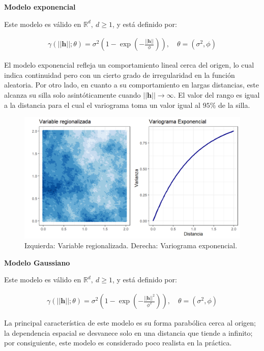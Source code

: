 \documentclass[
]{book}
\begin{document}
\textbf{Modelo exponencial}

Este modelo es válido en \(\mathbb{R}^d,\ d\geq 1\), y está definido por:

\begin{align}
    \gamma(||\textbf{h}||;\theta)=\sigma^2 \left(1-\exp\left(-\frac{||\textbf{h}||}{\phi}\right) \right),\quad \theta=(\sigma^2,\phi)
\end{align}

El modelo exponencial refleja un comportamiento lineal cerca del origen, lo cual indica continuidad pero con un cierto grado de irregularidad en la función aleatoria. Por otro lado, en cuanto a su comportamiento en largas distancias, este alcanza su silla solo asintóticamente cuando \(||\textbf{h}||\to \infty\). El valor del rango es igual a la distancia para el cual el variograma toma un valor igual al \(95\%\) de la silla.

\begin{figure}
\includegraphics[width=17.78in]{figuras/otros/exp_var} \caption{Izquierda: Variable regionalizada. Derecha: Variograma exponencial.}\label{fig:unnamed-chunk-3}
\end{figure}

\textbf{Modelo Gaussiano}

Este modelo es válido en \(\mathbb{R}^d,\ d\geq 1\), y está definido por:

\begin{align}
    \gamma(||\textbf{h}||;\theta)=\sigma^2\left(1-\exp\left(-\frac{||\textbf{h}||^2}{\phi^2} \right) \right),\quad \theta=(\sigma^2,\phi)
\end{align}

La principal característica de este modelo es su forma parabólica cerca al origen; la dependencia espacial se desvanece solo en una distancia que tiende a infinito; por consiguiente, este modelo es considerado poco realista en la práctica.
\end{document}
